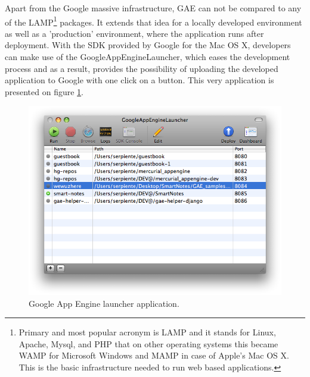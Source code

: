Apart from the Google massive infrastructure, GAE can not be compared to any of the LAMP\footnote{Primary and most popular acronym is LAMP and it stands for Linux, Apache, Mysql, and PHP that on other operating systems this became WAMP for Microsoft Windows and MAMP in case of Apple's Mac OS X. This is the basic infrastructure needed to run web based applications.} packages. It extends that idea for a locally developed environment as well as a 'production' environment, where the application runs after deployment. With the SDK provided by Google for the Mac OS X, developers can make use of the GoogleAppEngineLauncher, which eases the development process and as a result, provides the possibility of uploading the developed application to Google with one click on a button. This very application is presented on figure \ref{gae_launcher}.
\begin{figure}[h]
\begin{center}
\includegraphics[scale=0.4]{img/gae_launcher.png}
\caption{Google App Engine launcher application.}
\label{gae_launcher}
\end{center}
\end{figure}


